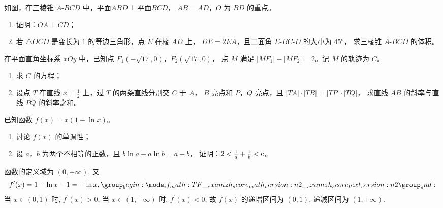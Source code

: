 \documentclass{exam-zh}
\begin{document}
\begin{problem}[points = 12]
  如图，在三棱锥 $A$-$BCD$ 中，$\text{平面} ABD \perp \text{平面} BCD$，
  $AB = AD$，$O$ 为 $BD$ 的重点。
  \begin{enumerate}
    \item 证明：$OA \perp CD$；
    \item 若 $\triangle OCD$ 是变长为 $1$ 的等边三角形，点 $E$ 在棱 $AD$ 上，
      $DE = 2 EA$，且二面角 $E$-$BC$-$D$ 的大小为 \ang{45}，
      求三棱锥 $A$-$BCD$ 的体积。
  \end{enumerate}
\end{problem}

\begin{problem}[points = 12]
  在平面直角坐标系 $xOy$ 中，已知点 $F_1 (-\sqrt{17}, 0)$，$F_2 (\sqrt{17}, 0)$，
  点 $M$ 满足 $|M F_1| - |M F_2| = 2$。记 $M$ 的轨迹为 $C$。
  \begin{enumerate}
    \item 求 $C$ 的方程；
    \item 设点 $T$ 在直线 $x = \frac{1}{2}$ 上，过 $T$ 的两条直线分别交 $C$ 于 $A$，
      $B$ 亮点和 $P$，$Q$ 亮点，且 $|TA| \cdot |TB| = |TP| \cdot |TQ|$，
      求直线 $AB$ 的斜率与直线 $PQ$ 的斜率之和。
  \end{enumerate}
\end{problem}

\begin{problem}[points = 12]
  已知函数 $f(x) = x (1 - \ln x)$。
  \begin{enumerate}
    \item 讨论 $f(x)$ 的单调性；
    \item 设 $a$，$b$ 为两个不相等的正数，且 $b \ln a - a \ln b = a - b$，
      证明：$2 < \frac{1}{a} + \frac{1}{b} < \mathrm{ e }$。
  \end{enumerate}
\end{problem}

\begin{solution}
  函数的定义域为 $(0, +\infty)$,
  又 \[f^{\prime}(x) = 1 - \ln x-1 = -\ln x, \score{2}\]
  当 $x \in(0, 1)$ 时, $f^{\prime}(x) > 0$, 当 $x \in(1, +\infty)$ 时, $f^{\prime}(x) < 0$,
  故 $f(x)$ 的递增区间为 $(0,1)$, 递减区间为 $(1, +\infty)$.
\end{solution}
\end{document}
